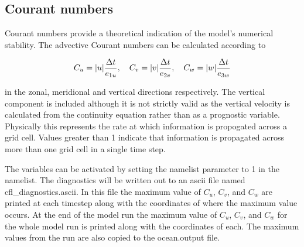 \documentclass[../main/NEMO_manual]{subfiles}
\begin{document}
\subsection{Courant numbers}

Courant numbers provide a theoretical indication of the model's numerical stability.
The advective Courant numbers can be calculated according to

\[
  C_u = |u|\frac{\Delta t}{e_{1u}}, \quad C_v = |v|\frac{\Delta t}{e_{2v}}, \quad C_w = |w|\frac{\Delta t}{e_{3w}}
\]

in the zonal, meridional and vertical directions respectively.
The vertical component is included although it is not strictly valid as the vertical velocity is calculated from
the continuity equation rather than as a prognostic variable.
Physically this represents the rate at which information is propogated across a grid cell.
Values greater than 1 indicate that information is propagated across more than one grid cell in a single time step.

The variables can be activated by setting the  namelist parameter to 1 in the  namelist.
The diagnostics will be written out to an ascii file named cfl\_diagnostics.ascii.
In this file the maximum value of $C_u$, $C_v$, and $C_w$ are printed at each timestep along with the coordinates of
where the maximum value occurs.
At the end of the model run the maximum value of $C_u$, $C_v$, and $C_w$ for the whole model run is printed along
with the coordinates of each.
The maximum values from the run are also copied to the ocean.output file. 


\biblio

\pindex
\end{document}
